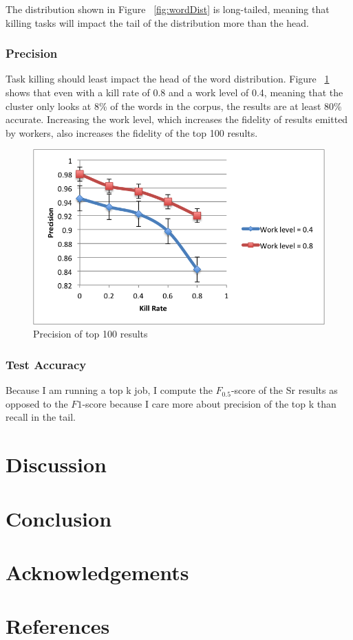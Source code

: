 \documentclass[12pt]{article}
\begin{document}
The distribution shown in Figure ~\ref{fig:wordDist} is long-tailed, meaning that killing tasks will impact the tail of the distribution more than the head.

\subsubsection{Precision}
Task killing should least impact the head of the word distribution. Figure ~\ref{fig:precision} shows that even with a kill rate of 0.8 and a work level of 0.4, meaning that the cluster only looks at 8\% of the words in the corpus, the results are at least 80\% accurate. Increasing the work level, which increases the fidelity of results emitted by workers, also increases the fidelity of the top 100 results.


\begin{figure}
\includegraphics[width=\linewidth]{top-100-precision.png}
\caption{Precision of top 100 results} 
\label{fig:precision}
\end{figure}

\subsubsection{Test Accuracy}
Because I am running a top k job, I compute the $F_{0.5}$-score of the Sr results as opposed to the $F1$-score because I care more about precision of the top k than recall in the tail.


\section{Discussion}

\section{Conclusion}

\section{Acknowledgements}

\section{References}
\end{document}

